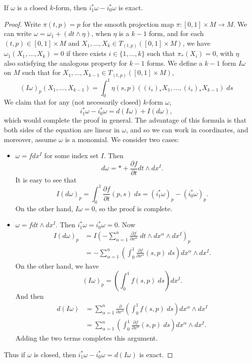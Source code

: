 \begin{lemma}
    If $\omega$ is a closed $k$-form, then $i_1^* \omega - i_0^* \omega$ is exact.
\end{lemma}
\begin{proof}
    Write $\pi(t,p) = p$ for the smooth projection map $\pi: [0,1] \times M \to M$. We can write $\omega = \omega_1 + (dt \wedge \eta)$, when $\eta$ is a $k-1$ form, and for each $(t,p) \in [0,1] \times M$ and $X_1, \dots, X_k \in T_{(t,p)}([0,1] \times M)$, we have $\omega_1(X_1, \dots, X_k) = 0$ if there exists $i \in \{ 1, \dots, k \}$ such that $\pi_*(X_i) = 0$, with $\eta$ also satisfying the analogous property for $k-1$ forms. We define a $k-1$ form $I\omega$ on $M$ such that for $X_1, \dots, X_{k-1} \in T_{(t,p)}([0,1] \times M)$,
    \[ (I\omega)_p(X_1, \dots, X_{k-1}) = \int_0^1 \eta(s,p)((i_s)_* X_1, \dots, (i_s)_* X_{k-1})\; ds \]
    We claim that for any (not necessarily closed) $k$-form $\omega$,
    \[ i_1^* \omega - i_0^* \omega = d(I\omega) + I(d \omega), \]
    which would complete the proof in general. The advantage of this formula is that both sides of the equation are linear in $\omega$, and so we can work in coordinates, and moreover, assume $\omega$ is a monomial. We consider two cases:
    \begin{itemize}
        \item $\omega = f dx^I$ for some index set $I$. Then
        \[ d\omega = * + \frac{\partial f}{\partial t} dt \wedge dx^I. \]
        It is easy to see that
        \[ I(d\omega)_p = \int_0^1 \frac{\partial f}{\partial t}(p,s)\; ds = (i^*_1 \omega)_p - (i^*_0 \omega)_p. \]
        On the other hand, $I \omega = 0$, so the proof is complete.

        \item $\omega = f dt \wedge dx^I$. Then $i_1^* \omega = i_0^* \omega = 0$. Now
        \begin{align*}
            I(d \omega)_p &= I \left( - \sum_{\alpha = 1}^n \frac{\partial f}{\partial x^\alpha}\; dt \wedge dx^\alpha \wedge dx^I \right)_p\\
            &= - \sum_{\alpha = 1}^n \left( \int_0^1 \frac{\partial f}{\partial x^\alpha}(s,p)\; ds \right) dx^\alpha \wedge dx^I.
        \end{align*}
        On the other hand, we have
        \[ (I \omega)_p = \left( \int_0^1 f(s,p)\; ds \right) dx^I. \]
        And then
        \begin{align*}
            d(I \omega) &= \sum_{\alpha = 1}^n \frac{\partial}{\partial x^\alpha} \left( \int_0^1 f(s,p)\; ds \right) dx^\alpha \wedge dx^I\\
            &= \sum_{\alpha = 1}^n \left( \int_0^1 \frac{\partial f}{\partial x^\alpha}(s,p)\; ds \right) dx^\alpha \wedge dx^I.
        \end{align*}
        Adding the two terms completes this argument.
    \end{itemize}
    Thus if $\omega$ is closed, then $i_1^* \omega - i_0^* \omega = d(I\omega)$ is exact.
\end{proof}

